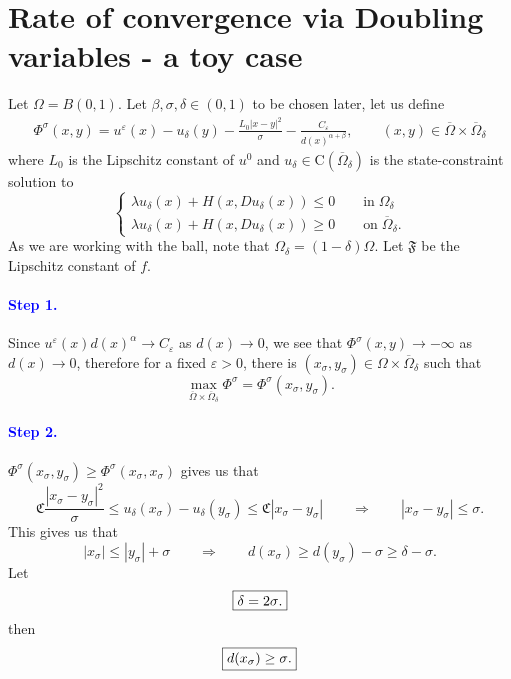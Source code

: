 \documentclass[11pt,reqno]{amsart}
\numberwithin{figure}{section}
\theoremstyle{plain}
\theoremstyle{remark}
\numberwithin{equation}{section}
\begin{document}
\section{Rate of convergence via Doubling variables - a toy case}
\noindent Let $\Omega = B(0,1)$. Let $\beta,\sigma,\delta \in (0,1)$ to be chosen later, let us define
\begin{align*}
    \Phi^{\sigma}(x,y) =  u^\varepsilon(x) - u_\delta(y) - \frac{L_0|x-y|^2}{\sigma}- \frac{C_\varepsilon}{d(x)^{\alpha+\beta}}, \qquad (x,y)\in \overline{\Omega}\times\overline{\Omega}_\delta
\end{align*}
where $L_0$ is the Lipschitz constant of $u^0$ and $u_\delta\in \mathrm{C}(\overline{\Omega}_\delta)$ is the state-constraint solution to
\begin{equation*}
    \begin{cases}  
    \lambda u_\delta(x) + H(x,Du_\delta(x)) \leq 0 \qquad\text{in}\; \Omega_\delta\\
    \lambda u_\delta(x) + H(x,Du_\delta(x)) \geq 0 \qquad\text{on}\; \overline{\Omega}_\delta.
    \end{cases}
\end{equation*}
As we are working with the ball, note that $\Omega_\delta = (1-\delta)\Omega$. Let $\mathfrak{F}$ be the Lipschitz constant of $f$.
\paragraph{\textcolor{blue}{\textbf{Step 1.}}} Since $u^\varepsilon (x)d(x)^\alpha \to C_\varepsilon$ as $d(x)\to 0$, we see that $\Phi^\sigma(x,y)\to -\infty$ as $d(x)\to 0$, therefore for a fixed $\varepsilon>0$, there is $(x_{\sigma},y_\sigma)\in \Omega\times\overline{\Omega}_\delta$ such that 
\begin{equation*}
    \max_{\overline{\Omega}\times \overline{\Omega}_\delta} \Phi^\sigma = \Phi^\sigma(x_\sigma,y_\sigma).
\end{equation*}
\paragraph{\textcolor{blue}{\textbf{Step 2.}}} $\Phi^\sigma(x_\sigma,y_\sigma) \geq \Phi^\sigma(x_\sigma,x_\sigma)$ gives us that
    \begin{equation}\label{e:est_sigma2}
        \mathfrak{C}\frac{|x_\sigma-y_\sigma|^2}{\sigma} \leq u_\delta(x_\sigma) - u_\delta(y_\sigma) \leq \mathfrak{C}|x_\sigma-y_\sigma| \qquad\Longrightarrow\qquad |x_\sigma -y _\sigma|\leq \sigma.
    \end{equation}
    This gives us that
    \begin{equation}\label{e:est_sigma3}
        |x_\sigma|\leq |y_\sigma|+\sigma \qquad\Longrightarrow\qquad d(x_\sigma) \geq d(y_\sigma) - \sigma\geq \delta-\sigma.
    \end{equation}
Let 
\begin{equation*}
   \fbox{$\displaystyle \delta = 2\sigma$.}
\end{equation*}
then 
\begin{equation*}
    \fbox{$d(x_\sigma) \geq \sigma$.}
\end{equation*}
\end{document}
